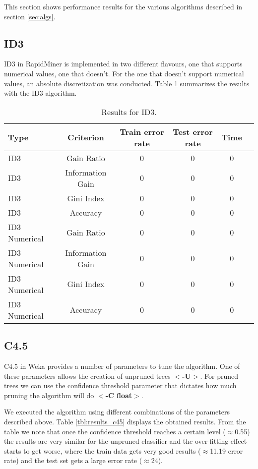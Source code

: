 \documentclass[a4paper]{llncs}
\begin{document}
This section shows performance results for the various algorithms described in section \ref{sec:algs}.

\subsection{ID3}

ID3 in RapidMiner is implemented in two different flavours, one that supports
numerical values, one that doesn't. For the one that doesn't support numerical
values, an absolute discretization was conducted. Table \ref{tbl:results_id3}
summarizes the results with the ID3 algorithm.

\begin{table}
  \begin{center}
  \begin{tabular}{ | l | c | c | c | c | c |}
    \hline
    \textbf{Type} & \textbf{Criterion} & \textbf{Train error rate} & \textbf{Test error rate} & \textbf{Time} \\ \hline
    ID3 & Gain Ratio & 0 & 0 & 0 \\ \hline
    ID3 & Information Gain & 0 & 0 & 0 \\ \hline
    ID3 & Gini Index & 0 & 0 & 0 \\ \hline
    ID3 & Accuracy & 0 & 0 & 0 \\ \hline
    ID3 Numerical & Gain Ratio & 0 & 0 & 0 \\ \hline
    ID3 Numerical & Information Gain & 0 & 0 & 0 \\ \hline
    ID3 Numerical & Gini Index & 0 & 0 & 0 \\ \hline
    ID3 Numerical & Accuracy & 0 & 0 & 0 \\ \hline
  \end{tabular}
  \caption{Results for ID3.}
  \label{tbl:results_id3}
  \end{center}
\end{table}

\subsection{C4.5}

C4.5 in Weka provides a number of parameters to tune the algorithm.
One of these parameters allows the creation of unpruned trees $<$\textbf{-U}$>$.
For pruned trees we can use the confidence threshold parameter that dictates how
much pruning the algorithm will do $<$\textbf{-C float}$>$.

We executed the algorithm using different combinations of the parameters described above.
Table \ref{tbl:results_c45} displays the obtained results. From the table
we note that once the confidence threshold reaches a certain level ($\approx$0.55) the results
are very similar for the unpruned classifier and the over-fitting effect starts to get worse,
where the train data gets very good results ($\approx$11.19 error rate) and the test set gets a
large error rate ($\approx$24).
\end{document}
